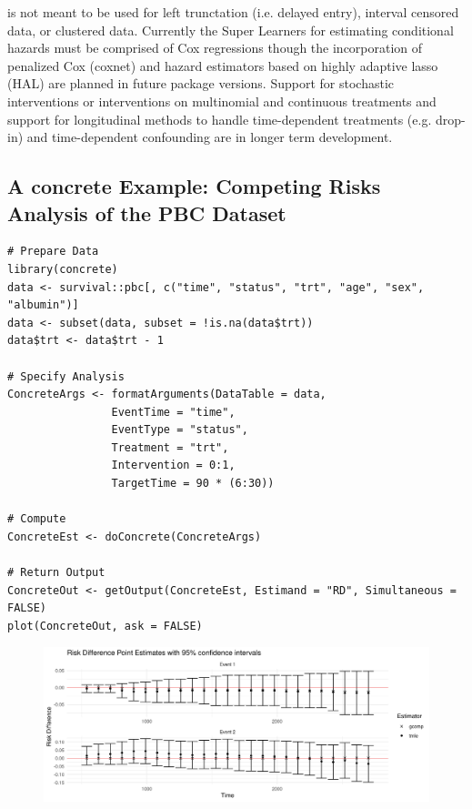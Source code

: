 \documentclass{report}
\newcommand{\1}{\ensuremath{\mathbf{1}}}
\begin{document}
 is not meant to be used for left trunctation (i.e. delayed entry), interval censored data, or clustered data. Currently the Super Learners for estimating conditional hazards must be comprised of Cox regressions though the incorporation of penalized Cox (coxnet) and hazard estimators based on highly adaptive lasso (HAL) are planned in future package versions. Support for stochastic interventions or interventions on multinomial and continuous treatments and support for longitudinal methods to handle time-dependent treatments (e.g. drop-in) and time-dependent confounding are in longer term development.

\subsection{A concrete Example: Competing Risks Analysis of the PBC Dataset}
\label{nutshell}
\begin{lstlisting}
# Prepare Data
library(concrete)
data <- survival::pbc[, c("time", "status", "trt", "age", "sex", "albumin")]
data <- subset(data, subset = !is.na(data$trt))
data$trt <- data$trt - 1

# Specify Analysis
ConcreteArgs <- formatArguments(DataTable = data,
				EventTime = "time",
				EventType = "status",
				Treatment = "trt",
				Intervention = 0:1,
				TargetTime = 90 * (6:30))

# Compute
ConcreteEst <- doConcrete(ConcreteArgs)

# Return Output
ConcreteOut <- getOutput(ConcreteEst, Estimand = "RD", Simultaneous = FALSE)
plot(ConcreteOut, ask = FALSE)
\end{lstlisting}

\begin{figure}[H]
\center
\includegraphics[width=\linewidth]{fig/RD.png}
\end{figure}
\end{document}
